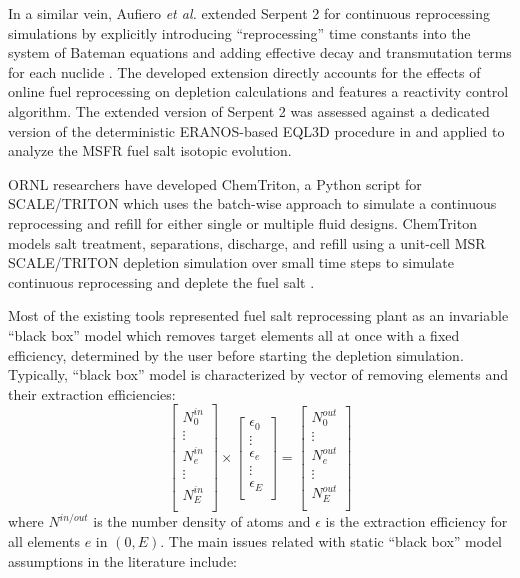 In a similar vein, Aufiero \emph{et al.} extended Serpent 2 for continuous 
reprocessing simulations by explicitly introducing ``reprocessing'' time 
constants into the system of Bateman equations and adding effective decay and 
transmutation terms for each nuclide \cite{aufiero_extended_2013}. The 
developed extension directly accounts for the effects of online fuel 
reprocessing on depletion calculations and features a reactivity control 
algorithm. The extended version of Serpent 2 was assessed against a dedicated 
version of the deterministic ERANOS-based EQL3D procedure in 
\cite{fiorina_investigation_2013} and applied to analyze the \gls{MSFR} fuel 
salt isotopic evolution.

\gls{ORNL} researchers have developed ChemTriton, a Python script for
SCALE/TRITON which uses the batch-wise approach to simulate a continuous 
reprocessing and refill for either single or multiple fluid designs. 
ChemTriton models salt treatment, separations, discharge, and refill using a 
unit-cell MSR SCALE/TRITON depletion simulation over small time steps to 
simulate continuous reprocessing and deplete the fuel salt 
\cite{powers_new_2013, betzler_fuel_2018}.

Most of the existing tools represented fuel salt reprocessing plant as an 
invariable ``black box'' model which removes target elements all at once with 
a fixed efficiency, determined by the user before starting the depletion 
simulation. Typically, ``black box'' model is characterized by vector of  
removing elements and their extraction efficiencies:
\begin{equation}
\begin{bmatrix}
N^{in}_{0} \\ \vdots \\ N^{in}_{e} \\ \vdots \\ N^{in}_{E} \\
\end{bmatrix} 
\times
\begin{bmatrix}
\epsilon_{0} \\ \vdots \\ \epsilon_{e} \\ \vdots \\ \epsilon_{E} \\
\end{bmatrix} =
\begin{bmatrix}
N^{out}_{0}\\ \vdots \\ N^{out}_{e} \\ \vdots \\N^{out}_{E}  \\
\end{bmatrix}
\end{equation}
where $N^{in/out}$ is the number density of atoms and $\epsilon$ is the 
extraction efficiency for all elements $e$ in $(0, E)$. The main issues 
related with static ``black box'' model assumptions in the literature include: 
